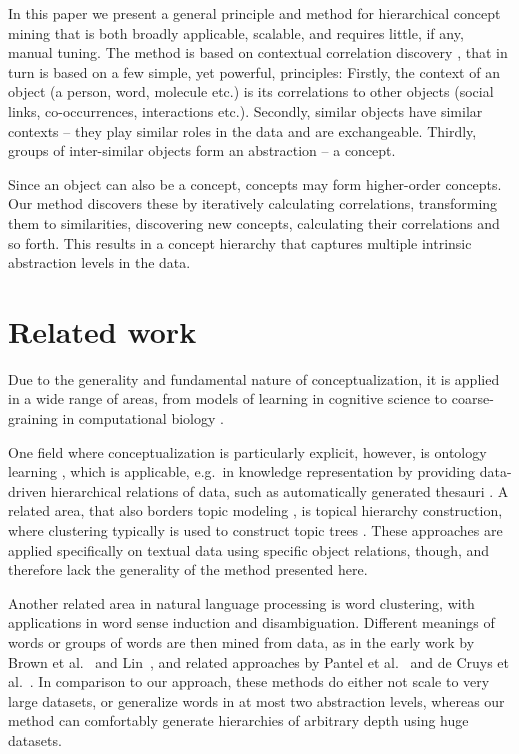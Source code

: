 \documentclass[conference]{IEEEtran}
\begin{document}
In this paper we present a general principle and method for hierarchical concept mining that is both broadly applicable, scalable, and requires
little, if any, manual tuning. The method is based on contextual correlation discovery \cite{Gornerup15}, that in turn is based on a few simple, yet powerful, principles:
Firstly, the context of an object (a person, word, molecule etc.) is its correlations to other objects (social links, co-occurrences, interactions etc.).
Secondly, similar objects have similar contexts -- they play similar roles in the data and are exchangeable. 
Thirdly, groups of inter-similar objects form an abstraction -- a concept.

Since an object can also be a concept, concepts may form higher-order concepts. Our method discovers these by
iteratively calculating correlations, transforming them to similarities, discovering new concepts, calculating their correlations and so forth. This results in 
a concept hierarchy that captures multiple intrinsic abstraction levels in the data.

\section{Related work}
\label{sec:relatedwork}

Due to the generality and fundamental nature of conceptualization, it is applied in a wide range of areas, from models 
of learning in cognitive science \cite{tenenbaum00} to coarse-graining in computational biology \cite{Saunders13}. 

One field where conceptualization is particularly explicit, however, is 
ontology learning \cite{Wong2012ontology}, which is applicable, e.g.\ in knowledge representation by providing data-driven 
hierarchical relations of data, such as automatically generated thesauri \cite{Yijun97}. A related area, that also borders topic modeling 
\cite{Blei12}, is topical hierarchy construction, 
where clustering typically is used to construct topic trees \cite{Liu12, Wang13, Wang15}. These approaches
are applied specifically on textual data using specific object relations, though, and therefore lack the generality of the method presented here.

Another related area in natural language processing is word clustering, with applications in word sense induction and disambiguation.
Different meanings of words or groups of words are then mined from data, as in the early work by Brown et al.\ \cite{Brown1992} 
and Lin\ \cite{Lin1998}, and related approaches by Pantel et al.\ \cite{Pantel02} and de Cruys et al.\ \cite{Cruys11}. 
In comparison to our approach, these methods do either not scale to very large datasets, or generalize
words in at most two abstraction levels, whereas our method can comfortably generate hierarchies of arbitrary depth using huge datasets.
\end{document}
